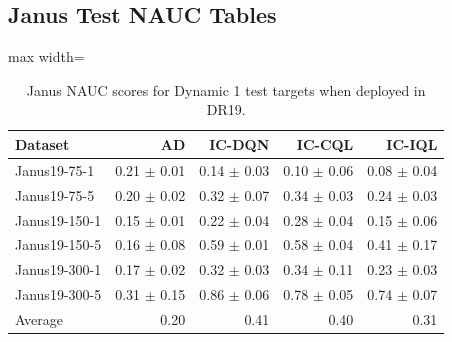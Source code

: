 \documentclass{article}
\begin{document}
\subsection{Janus Test NAUC Tables}
\label{app:tab_janus}
\begin{table}[ht]
    \label{tab:}
    \begin{center}
    \caption{Janus NAUC scores for Dynamic 1 test targets when deployed in DR19.}
    \begin{small}
    \begin{adjustbox}{max width=\columnwidth}
		\begin{tabular}{l|rrrr}
		\toprule
	\textbf{Dataset} & \textbf{AD} & \textbf{IC-DQN} & \textbf{IC-CQL} & \textbf{IC-IQL}\\
\midrule
Janus19-75-1 & 0.21 $\pm$ 0.01 & 0.14 $\pm$ 0.03 & 0.10 $\pm$ 0.06 & 0.08 $\pm$ 0.04\\
Janus19-75-5 & 0.20 $\pm$ 0.02 & 0.32 $\pm$ 0.07 & 0.34 $\pm$ 0.03 & 0.24 $\pm$ 0.03\\
Janus19-150-1 & 0.15 $\pm$ 0.01 & 0.22 $\pm$ 0.04 & 0.28 $\pm$ 0.04 & 0.15 $\pm$ 0.06\\
Janus19-150-5 & 0.16 $\pm$ 0.08 & 0.59 $\pm$ 0.01 & 0.58 $\pm$ 0.04 & 0.41 $\pm$ 0.17\\
Janus19-300-1 & 0.17 $\pm$ 0.02 & 0.32 $\pm$ 0.03 & 0.34 $\pm$ 0.11 & 0.23 $\pm$ 0.03\\
Janus19-300-5 & 0.31 $\pm$ 0.15 & 0.86 $\pm$ 0.06 & 0.78 $\pm$ 0.05 & 0.74 $\pm$ 0.07\\
\midrule
Average & 0.20 & 0.41 & 0.40 & 0.31\\
\end{tabular}
        \end{adjustbox}
    \end{small}
    \end{center}
    \vskip -0.1in
\end{table}
\end{document}
